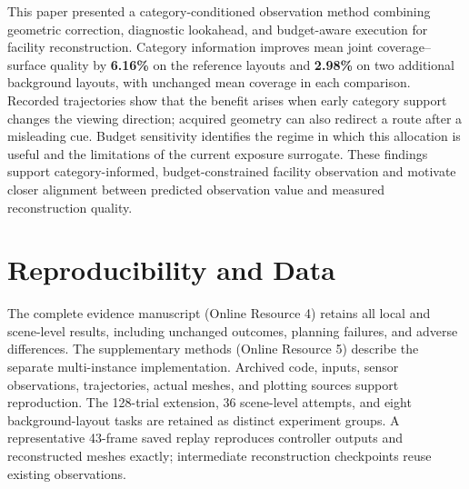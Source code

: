 \documentclass[pdflatex,sn-mathphys-num]{sn-jnl}
\begin{document}
This paper presented a category-conditioned observation method combining geometric correction, diagnostic lookahead, and budget-aware execution for facility reconstruction. Category information improves mean joint coverage--surface quality by \textbf{6.16\%} on the reference layouts and \textbf{2.98\%} on two additional background layouts, with unchanged mean coverage in each comparison. Recorded trajectories show that the benefit arises when early category support changes the viewing direction; acquired geometry can also redirect a route after a misleading cue. Budget sensitivity identifies the regime in which this allocation is useful and the limitations of the current exposure surrogate. These findings support category-informed, budget-constrained facility observation and motivate closer alignment between predicted observation value and measured reconstruction quality.

\hypertarget{reproducibility-and-data}{%
\section{Reproducibility and Data}\label{reproducibility-and-data}}

The complete evidence manuscript (Online Resource 4) retains all local and scene-level results, including unchanged outcomes, planning failures, and adverse differences. The supplementary methods (Online Resource 5) describe the separate multi-instance implementation. Archived code, inputs, sensor observations, trajectories, actual meshes, and plotting sources support reproduction. The 128-trial extension, 36 scene-level attempts, and eight background-layout tasks are retained as distinct experiment groups. A representative 43-frame saved replay reproduces controller outputs and reconstructed meshes exactly; intermediate reconstruction checkpoints reuse existing observations.
\end{document}
